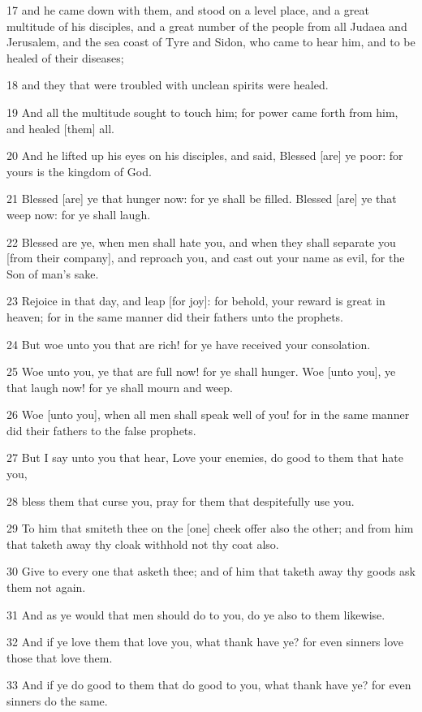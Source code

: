 \par 17 and he came down with them, and stood on a level place, and a great multitude of his disciples, and a great number of the people from all Judaea and Jerusalem, and the sea coast of Tyre and Sidon, who came to hear him, and to be healed of their diseases;
\par 18 and they that were troubled with unclean spirits were healed.
\par 19 And all the multitude sought to touch him; for power came forth from him, and healed [them] all.
\par 20 And he lifted up his eyes on his disciples, and said, Blessed [are] ye poor: for yours is the kingdom of God.
\par 21 Blessed [are] ye that hunger now: for ye shall be filled. Blessed [are] ye that weep now: for ye shall laugh.
\par 22 Blessed are ye, when men shall hate you, and when they shall separate you [from their company], and reproach you, and cast out your name as evil, for the Son of man's sake.
\par 23 Rejoice in that day, and leap [for joy]: for behold, your reward is great in heaven; for in the same manner did their fathers unto the prophets.
\par 24 But woe unto you that are rich! for ye have received your consolation.
\par 25 Woe unto you, ye that are full now! for ye shall hunger. Woe [unto you], ye that laugh now! for ye shall mourn and weep.
\par 26 Woe [unto you], when all men shall speak well of you! for in the same manner did their fathers to the false prophets.
\par 27 But I say unto you that hear, Love your enemies, do good to them that hate you,
\par 28 bless them that curse you, pray for them that despitefully use you.
\par 29 To him that smiteth thee on the [one] cheek offer also the other; and from him that taketh away thy cloak withhold not thy coat also.
\par 30 Give to every one that asketh thee; and of him that taketh away thy goods ask them not again.
\par 31 And as ye would that men should do to you, do ye also to them likewise.
\par 32 And if ye love them that love you, what thank have ye? for even sinners love those that love them.
\par 33 And if ye do good to them that do good to you, what thank have ye? for even sinners do the same.
